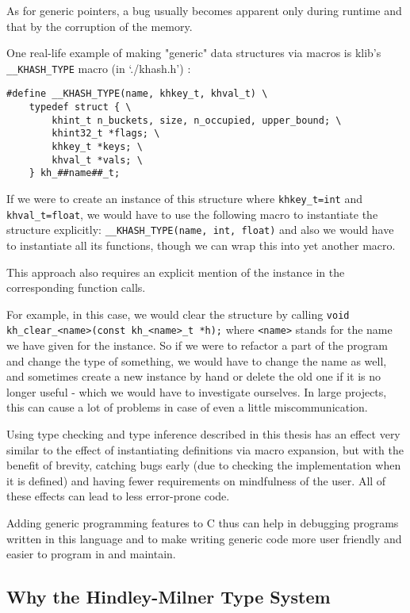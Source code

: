 As for generic pointers, a bug usually becomes apparent only during runtime and that by the corruption of the memory.

One real-life example of making "generic" data structures via macros is klib's \lstinline{__KHASH_TYPE} macro (in `./khash.h') \cite{attractivechaos2020klib}:

\begin{lstlisting}
#define __KHASH_TYPE(name, khkey_t, khval_t) \
    typedef struct { \
        khint_t n_buckets, size, n_occupied, upper_bound; \
        khint32_t *flags; \
        khkey_t *keys; \
        khval_t *vals; \
    } kh_##name##_t;
\end{lstlisting}

If we were to create an instance of this structure where \lstinline{khkey_t=int} and \lstinline{khval_t=float}, we would have to use the following macro to instantiate the structure explicitly: \lstinline{__KHASH_TYPE(name, int, float)} and also we would have to instantiate all its functions, though we can wrap this into yet another macro.

This approach also requires an explicit mention of the instance in the corresponding function calls.

For example, in this case, we would clear the structure by calling
\lstinline{void kh_clear_<name>(const kh_<name>_t *h);} where \lstinline{<name>} stands for the name we have given for the instance. So if we were to refactor a part of the program and change the type of something, we would have to change the name as well, and sometimes create a new instance by hand or delete the old one if it is no longer useful - which we would have to investigate ourselves. In large projects, this can cause a lot of problems in case of even a little miscommunication.

Using type checking and type inference described in this thesis has an effect very similar to the effect of instantiating definitions via macro expansion, but with the benefit of brevity, catching bugs early (due to checking the implementation when it is defined) and having fewer requirements on mindfulness of the user. All of these effects can lead to less error-prone code.

Adding generic programming features to C thus can help in debugging programs written in this language and to make writing generic code more user friendly and easier to program in and maintain.

\subsection{Why the Hindley-Milner Type System}

